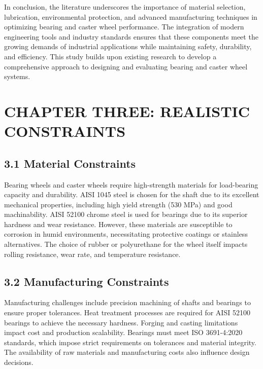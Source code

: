 \documentclass[../../main]{subfiles}
\begin{document}
In conclusion, the literature underscores the importance of material
selection, lubrication, environmental protection, and advanced
manufacturing techniques in optimizing bearing and caster wheel
performance. The integration of modern engineering tools and industry
standards ensures that these components meet the growing demands of
industrial applications while maintaining safety, durability, and
efficiency. This study builds upon existing research to develop a
comprehensive approach to designing and evaluating bearing and caster
wheel systems.

\section{CHAPTER THREE: REALISTIC
CONSTRAINTS}\label{chapter-three-realistic-constraints}

\subsection{3.1 Material Constraints}\label{material-constraints}

Bearing wheels and caster wheels require high-strength materials for
load-bearing capacity and durability. AISI 1045 steel is chosen for the
shaft due to its excellent mechanical properties, including high yield
strength (530 MPa) and good machinability. AISI 52100 chrome steel is
used for bearings due to its superior hardness and wear resistance.
However, these materials are susceptible to corrosion in humid
environments, necessitating protective coatings or stainless
alternatives. The choice of rubber or polyurethane for the wheel itself
impacts rolling resistance, wear rate, and temperature resistance.

\subsection{3.2 Manufacturing
Constraints}\label{manufacturing-constraints}

Manufacturing challenges include precision machining of shafts and
bearings to ensure proper tolerances. Heat treatment processes are
required for AISI 52100 bearings to achieve the necessary hardness.
Forging and casting limitations impact cost and production scalability.
Bearings must meet ISO 3691-4:2020 standards, which impose strict
requirements on tolerances and material integrity. The availability of
raw materials and manufacturing costs also influence design decisions.
\end{document}
